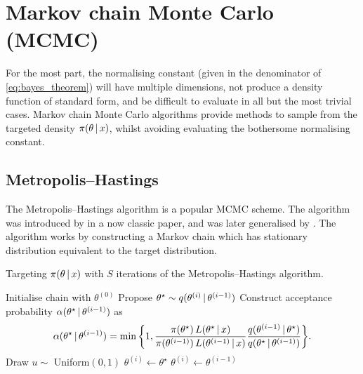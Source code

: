 \section{Markov chain Monte Carlo (MCMC)}
\label{sec:mcmc}

For the most part, the normalising constant (given in the denominator of
\cref{eq:bayes_theorem}) will have multiple dimensions, not produce a density function of
standard form, and be difficult to evaluate in all but the most trivial cases. Markov
chain Monte Carlo algorithms provide methods to sample from the targeted density
$\pi(\theta \,|\, x)$, whilst avoiding evaluating the bothersome normalising
constant.

\subsection{Metropolis--Hastings}
\label{ssec:metropolis_hastings}

The Metropolis--Hastings algorithm is a popular MCMC scheme. The algorithm was introduced
by \textcite{metropolis53} in a now classic paper, and was later generalised by
\textcite{hastings70}. The algorithm works by constructing a Markov chain which has
stationary distribution equivalent to the target distribution.

\begin{algorithm}
  \caption{Targeting $\pi(\theta \,|\, x)$ with $S$ iterations of the
    Metropolis--Hastings algorithm.}
  \label{alg:metropolis_hastings}
  \begin{algorithmic}[1]
    \State Initialise chain with $\theta^{(0)}$
      \State Propose ${\theta}^\star \sim q(\theta^{(i)} \,|\, \theta^{(i-1)})$
      \State Construct acceptance probability $\alpha(\theta^\star \,|\, \theta^{(i-1)})$ as
      \begin{equation*}
          \alpha(\theta^\star \given \theta^{(i-1)}) =
        \min\bigg\{1,
        \frac{\pi(\theta^\star) \, L(\theta^\star \given  x)}%
        {\pi(\theta^{(i-1)}) \, L(\theta^{(i-1)} \given  x)}
        \frac{q(\theta^{(i-1)} \given \theta^\star)}%
        {q(\theta^\star \given \theta^{(i-1)})}
        \bigg\}.
      \end{equation*}
      \State Draw $u \sim$ Uniform$(0, 1)$
        \State {}
        \State $\theta^{(i)} \leftarrow \theta^\star$
      \Else
        \State {}
        \State $\theta^{(i)} \leftarrow \theta^{(i-1)}$
      \EndIf
    \EndFor
  \end{algorithmic}
\end{algorithm}

